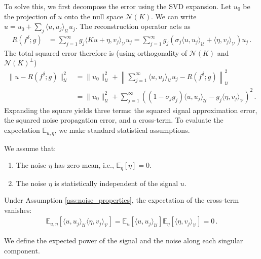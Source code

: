 To solve this, we first decompose the error using the SVD expansion. Let $u_0$ be the projection of $u$ onto the null space $\mathcal{N}(K)$. We can write $u = u_0 + \sum_j \langle u, u_j \rangle_{\mathcal{U}} u_j$. The reconstruction operator acts as
\begin{align*}
R(f^\delta; g) &= \sum_{j = 1}^\infty g_j \langle K u + \eta, v_j \rangle_{\mathcal{V}} u_j = \sum_{j = 1}^\infty g_j (\sigma_j \langle u, u_j \rangle_{\mathcal{U}} + \langle \eta, v_j \rangle_{\mathcal{V}}) u_j \, .
\end{align*}
The total squared error therefore is (using orthogonality of $\mathcal{N}(K)$ and $\mathcal{N}(K)^\perp$)
\begin{align*}
\| u - R(f^\delta; g) \|_{\mathcal{U}}^2 &= \|u_0\|_{\mathcal{U}}^2 + \left\| \sum_{j = 1}^\infty \langle u, u_j \rangle_{\mathcal{U}} u_j - R(f^\delta; g) \right\|_{\mathcal{U}}^2 \\
&= \|u_0\|_{\mathcal{U}}^2 + \sum_{j=1}^\infty \left( (1 - \sigma_j g_j)\langle u, u_j \rangle_{\mathcal{U}} - g_j \langle \eta, v_j \rangle_{\mathcal{V}} \right)^2 \, .
\end{align*}
Expanding the square yields three terms: the squared signal approximation error, the squared noise propagation error, and a cross-term. To evaluate the expectation $\mathbb{E}_{u,\eta}$, we make standard statistical assumptions.

\begin{assumption}\label{ass:noise_properties}\normalfont
We assume that:
\begin{enumerate}
\item The noise $\eta$ has zero mean, i.e., $\mathbb{E}_\eta[\eta] = 0$.
\item The noise $\eta$ is statistically independent of the signal $u$.
\end{enumerate}
\end{assumption}

\noindent Under Assumption \ref{ass:noise_properties}, the expectation of the cross-term vanishes:
\begin{align*}
\mathbb{E}_{u,\eta}[\langle u, u_j \rangle_{\mathcal{U}} \langle \eta, v_j \rangle_{\mathcal{V}}] = \mathbb{E}_u[\langle u, u_j \rangle_{\mathcal{U}}] \mathbb{E}_\eta[\langle \eta, v_j \rangle_{\mathcal{V}}] = 0 \, .
\end{align*}

\noindent We define the expected power of the signal and the noise along each singular component.

